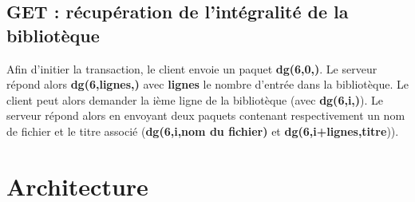 \documentclass[10pt,a4paper]{article}
\begin{document}
\subsection{GET : récupération de l'intégralité de la bibliotèque}
Afin d'initier la transaction, le client envoie un paquet \textbf{dg(6,0,)}.
Le serveur répond alors \textbf{dg(6,lignes,)} avec \textbf{lignes} le nombre d'entrée dans la bibliotèque.
Le client peut alors demander la ième ligne de la bibliotèque (avec \textbf{dg(6,i,)}). Le serveur répond alors en envoyant deux paquets contenant respectivement un nom de fichier et le titre associé (\textbf{dg(6,i,nom du fichier)} et \textbf{dg(6,i+lignes,titre})).

\section{Architecture}
\end{document}
